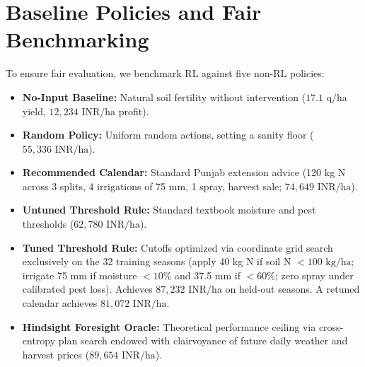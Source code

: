 \documentclass[10pt,twocolumn]{article}
\begin{document}
\section{Baseline Policies and Fair Benchmarking}
To ensure fair evaluation, we benchmark RL against five non-RL policies:
\begin{itemize}
    \item \textbf{No-Input Baseline:} Natural soil fertility without intervention ($17.1\text{ q/ha}$ yield, $12{,}234\text{ INR/ha}$ profit).
    \item \textbf{Random Policy:} Uniform random actions, setting a sanity floor ($55{,}336\text{ INR/ha}$).
    \item \textbf{Recommended Calendar:} Standard Punjab extension advice (120 kg N across 3 splits, 4 irrigations of 75 mm, 1 spray, harvest sale; $74{,}649\text{ INR/ha}$).
    \item \textbf{Untuned Threshold Rule:} Standard textbook moisture and pest thresholds ($62{,}780\text{ INR/ha}$).
    \item \textbf{Tuned Threshold Rule:} Cutoffs optimized via coordinate grid search exclusively on the 32 training seasons (apply 40 kg N if soil N $<100\text{ kg/ha}$; irrigate 75 mm if moisture $<10\%$ and 37.5 mm if $<60\%$; zero spray under calibrated pest loss). Achieves \textbf{$87{,}232\text{ INR/ha}$} on held-out seasons. A retuned calendar achieves $81{,}072\text{ INR/ha}$.
    \item \textbf{Hindsight Foresight Oracle:} Theoretical performance ceiling via cross-entropy plan search endowed with clairvoyance of future daily weather and harvest prices (\textbf{$89{,}654\text{ INR/ha}$}).
\end{itemize}

\end{document}
